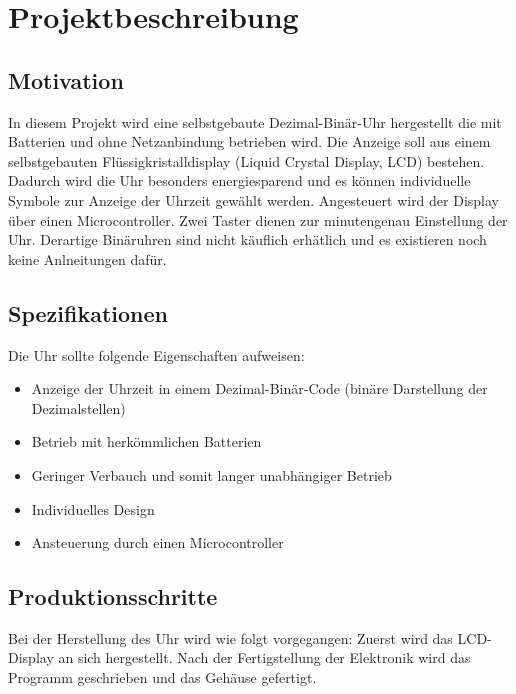 \section{Projektbeschreibung}
\subsection{Motivation}
In diesem Projekt wird eine selbstgebaute Dezimal-Binär-Uhr hergestellt die mit Batterien und ohne Netzanbindung betrieben wird. Die Anzeige soll aus einem selbstgebauten Flüssigkristalldisplay (Liquid Crystal Display, LCD) bestehen. Dadurch wird die Uhr besonders energiesparend und es können individuelle Symbole zur Anzeige der Uhrzeit gewählt werden. Angesteuert wird der Display über einen Microcontroller. Zwei Taster dienen zur minutengenau Einstellung der Uhr. Derartige Binäruhren sind nicht käuflich erhätlich und es existieren noch keine Anlneitungen dafür.

\subsection{Spezifikationen}
Die Uhr sollte folgende Eigenschaften aufweisen:
\begin{itemize}
\item Anzeige der Uhrzeit in einem Dezimal-Binär-Code (binäre Darstellung der Dezimalstellen)
\item Betrieb mit herkömmlichen Batterien
\item Geringer Verbauch und somit langer unabhängiger Betrieb
\item Individuelles Design
\item Ansteuerung durch einen Microcontroller
\end{itemize}

\subsection{Produktionsschritte}

Bei der Herstellung des Uhr wird wie folgt vorgegangen: Zuerst wird das LCD-Display an sich hergestellt. Nach der Fertigstellung der Elektronik wird das Programm geschrieben und das Gehäuse gefertigt. 



